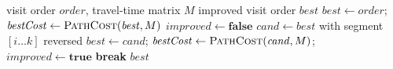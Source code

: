 \begin{algorithm}[H]
  \caption{2-Opt local search refinement.}
  \label{alg:twoopt}
  \begin{algorithmic}[1]
    \Require visit order $\mathit{order}$, travel-time matrix $M$
    \Ensure  improved visit order $\mathit{best}$
    \State $\mathit{best} \gets \mathit{order}$; \;
           $\mathit{bestCost} \gets \Call{PathCost}{\mathit{best}, M}$
      \State $\mathit{improved} \gets \textbf{false}$
          \State $\mathit{cand} \gets \mathit{best}$ with segment $[i \ldots k]$ reversed
            \State $\mathit{best} \gets \mathit{cand}$; \;
                   $\mathit{bestCost} \gets \Call{PathCost}{\mathit{cand}, M}$; \;
                   $\mathit{improved} \gets \textbf{true}$
          \EndIf
        \EndFor
      \EndFor
       \textbf{break} \EndIf
    \EndFor
    \State \Return $\mathit{best}$
  \end{algorithmic}
\end{algorithm}

